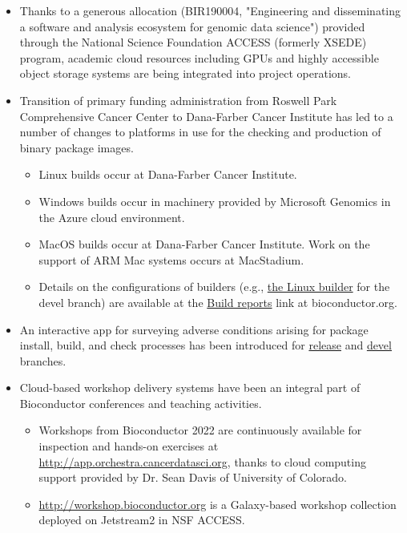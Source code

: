\begin{itemize}
\item Thanks to a generous allocation (BIR190004, "Engineering and disseminating a software and analysis ecosystem for genomic data science") provided through the National Science
Foundation ACCESS (formerly XSEDE) program, academic cloud resources including
GPUs and highly accessible object storage systems are being integrated
into project operations.
\item Transition of primary funding administration from Roswell Park Comprehensive
Cancer Center to Dana-Farber Cancer Institute has led to a number of changes to
platforms in use for the checking and production of binary package images.
\begin{itemize}
\item Linux builds occur at Dana-Farber Cancer Institute.
\item Windows builds occur in machinery provided by Microsoft Genomics
in the Azure cloud environment.
\item MacOS builds occur at Dana-Farber Cancer Institute.  Work on the
support of ARM Mac systems occurs at MacStadium.
\item Details on the configurations of builders (e.g.,
\href{https://bioconductor.org/checkResults/3.16/bioc-LATEST/nebbiolo2-NodeInfo.html}{the Linux builder}
for the devel branch) are available at the
\href{https://bioconductor.org/checkResults/}{Build reports} link at bioconductor.org.
\end{itemize}
\item An interactive app for surveying adverse conditions arising
for package install, build, and check processes has been introduced
for \href{https://vjcitn.shinyapps.io/biocPkgState315/}{release} and
\href{https://vjcitn.shinyapps.io/biocPkgState316/}{devel} branches.
\item Cloud-based workshop delivery systems have been an integral part
of Bioconductor conferences and teaching activities.
\begin{itemize}
\item Workshops from Bioconductor 2022 are continuously available for
inspection and hands-on exercises at \url{http://app.orchestra.cancerdatasci.org}, thanks
to cloud computing support provided by Dr. Sean Davis of University of Colorado.
\item \url{http://workshop.bioconductor.org} is a Galaxy-based workshop collection
deployed on Jetstream2 in NSF ACCESS.
\end{itemize}
\end{itemize}

